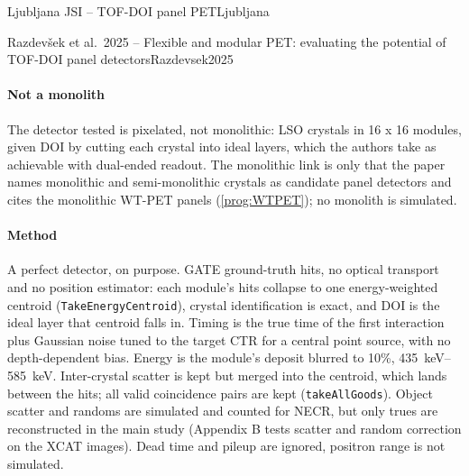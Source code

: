 \begin{programnote}{Ljubljana JSI -- TOF-DOI panel PET}{Ljubljana}
\begin{papernote}{Razdevšek et al.\ 2025 -- Flexible and modular PET: evaluating the potential of TOF-DOI panel detectors}{Razdevsek2025}
\paragraph{Not a monolith}
The detector tested is pixelated, not monolithic: 
LSO crystals in 16 x 16 modules, given DOI by cutting each crystal into ideal
layers, which the authors take as achievable with dual-ended readout. The
monolithic link is only that the paper names monolithic and semi-monolithic
crystals as candidate panel detectors and cites the monolithic WT-PET panels
(\ref{prog:WTPET}); no monolith is simulated.

\paragraph{Method}
A perfect detector, on purpose. GATE ground-truth hits, no optical transport
and no position estimator: each module's hits collapse to one energy-weighted
centroid (\texttt{TakeEnergyCentroid}), crystal identification is exact, and
DOI is the ideal layer that centroid falls in. Timing is the true time of the
first interaction plus Gaussian noise tuned to the target CTR for a central
point source, with no depth-dependent bias. Energy is the module's deposit
blurred to 10\%, \qtyrange{435}{585}{\kilo\electronvolt}. Inter-crystal
scatter is kept but merged into the centroid, which lands between the hits;
all valid coincidence pairs are kept (\texttt{takeAllGoods}). Object scatter
and randoms are simulated and counted for NECR, but only trues are
reconstructed in the main study (Appendix B tests scatter and random
correction on the XCAT images). Dead time and pileup are ignored, positron range is not
simulated.


\end{papernote}
\end{programnote}
